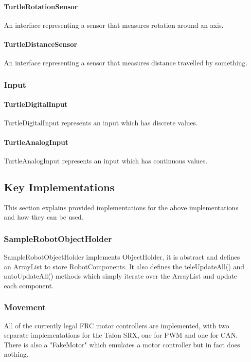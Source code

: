\documentclass[]{report}
\begin{document}
\paragraph{TurtleRotationSensor}
An interface representing a sensor that measures rotation around an axis.
\paragraph{TurtleDistanceSensor}
An interface representing a sensor that measures distance travelled by something.


\subsubsection{Input}
\paragraph{TurtleDigitalInput}
TurtleDigitalInput represents an input which has discrete values.
\paragraph{TurtleAnalogInput}
TurtleAnalogInput represents an input which has continuous values.

\subsection{Key Implementations}
This section explains provided implementations for the above implementations and how they can be used.

\subsubsection{SampleRobotObjectHolder}
SampleRobotObjectHolder implements ObjectHolder, it is abstract and defines an ArrayList to store RobotComponents.
It also defines the teleUpdateAll() and autoUpdateAll() methods which simply iterate over the ArrayList and update each component.

\subsubsection{Movement}
All of the currently legal FRC motor controllers are implemented, with two separate implementations for the Talon SRX, one for PWM and one for CAN.
There is also a "FakeMotor" which emulates a motor controller but in fact does nothing.
\end{document}
